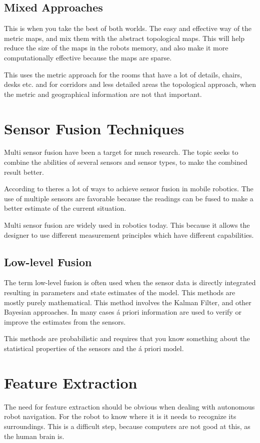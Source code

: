 \subsection{Mixed Approaches}
This is when you take the best of both worlds. The easy and effective way of the metric
maps, and mix them with the abstract topological maps. This will help reduce the size of
the maps in the robots memory, and also make it more computationally effective because the
maps are sparse. 

This uses 
the metric approach for the rooms that have a lot of details, chairs, desks etc. and for
corridors and less detailed areas the topological approach, when the metric and
geographical information are not that important. 
\cite{thrun}

\section{Sensor Fusion Techniques}
Multi sensor fusion have been a target for much research. The topic seeks to combine the
abilities of several sensors and sensor types, to make the combined result better. 


According to \cite{sensor-fusion-mobile-robots} theres a lot of ways to achieve sensor
fusion in mobile robotics. The use of multiple sensors are favorable because the readings
can be fused to make a better estimate of the current situation. 

Multi sensor fusion are widely used in robotics today. This because it allows the designer
to use different measurement principles which have different capabilities. 


\subsection{Low-level Fusion}
The term low-level fusion is often used when the sensor data is directly integrated
resulting in parameters and state estimates of the model. This methods are mostly purely
mathematical. This method involves the Kalman Filter, and other Bayesian approaches. In
many cases \'a priori information are used to verify or improve the
estimates from the sensors.

This methods are probabilistic and requires that you know something about the
statistical properties of the sensors and the \'a priori model. 



\section{Feature Extraction}
\label{chap2:sec-feature-extraction}
The need for feature extraction should be obvious when dealing with autonomous robot
navigation. For the robot to know where it is it needs to recognize its surroundings. This
is a difficult step, because computers are not good at this, as the human
brain is. 


